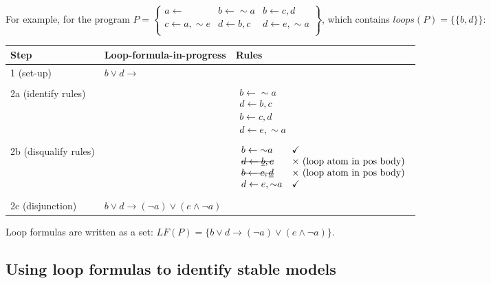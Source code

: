 \documentclass[9pt,a4paper,landscape]{article}
\newcommand{\msout}[1]{\text{\sout{$#1$}}}
\begin{document}
{For example, for the program $P = \left\{\begin{array}{lll}
a \leftarrow & b \leftarrow {\sim} a & b \leftarrow c, d\\
c \leftarrow a, {\sim} e & d \leftarrow b, c & d \leftarrow e, {\sim} a\\
\end{array}\right\}$, which contains $loops(P) = \{ \{b, d\} \}$:

\begin{center}
	\begin{tabular}{p{3cm}p{5cm}p{6cm}}
		Step & Loop-formula-in-progress & Rules \\ \midrule
		1 (set-up) & $b \lor d \rightarrow$ & \\ & \\
		2a (identify rules) &  & $\begin{array}{l}
		b \leftarrow {\sim} a\\
		d \leftarrow b, c\\
		b \leftarrow c, d\\
		d \leftarrow e, {\sim} a
		\end{array}$  \\ & \\
		2b (disqualify rules) &  & $\begin{array}{ll}
		b \leftarrow {\sim} a & \checkmark \\
		\msout{d \leftarrow \underline{b}, c} & \times  \text{ (loop atom in pos body)}\\
		\msout{b \leftarrow c, \underline{d}} & \times  \text{ (loop atom in pos body)}\\
		d \leftarrow e, {\sim} a & \checkmark
		\end{array}$  \\ & \\
		2c (disjunction) & $b \lor d \rightarrow (\neg a) \lor (e \land \neg a)$
	\end{tabular}
\end{center}

Loop formulas are written as a set: $LF(P) = \{ b \lor d \rightarrow (\neg a) \lor (e \land \neg a) \}$.
\vspace{\baselineskip}


\subsection{Using loop formulas to identify stable models}

}
\end{document}
